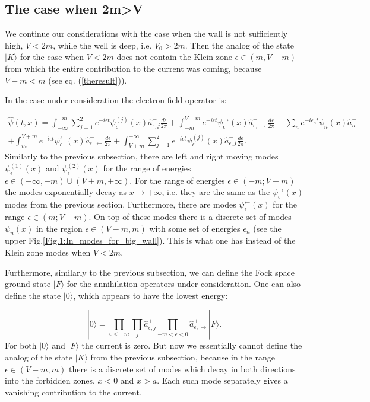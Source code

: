 \documentclass[12pt]{article}
\begin{document}
\subsection{The case when 2m>V}

We continue our considerations with the case when the wall is not sufficiently high, $V<2m$, while the well is deep, i.e. $V_0 > 2m$. Then the analog of the state $|K\rangle$ for the case when $V<2m$ does not contain the Klein zone $\epsilon \in (m,V-m)$ from which the entire contribution to the current was coming, because $V-m < m$ (see eq. (\ref{theresult})).

In the case under consideration the electron field operator is: 

\begin{gather}
\hat{\psi}(t,x) = \int^{-m}_{-\infty}\sum_{j=1}^2e^{-i\epsilon t}\psi_{\epsilon}^{(j)}(x)\hat{a}^{-}_{\epsilon,j}\frac{d\epsilon}{2\pi} +\int^{V-m}_{-m}e^{-i\epsilon t}\psi^{\rightarrow}_{\epsilon}(x)\hat{a}^{-}_{\epsilon,\rightarrow}\frac{d\epsilon}{2\pi}+\sum_{n}e^{-i\epsilon_n t}\psi_{n}(x)\hat{a}^{-}_{n}+\nonumber \\
+\int^{V+m}_{m}e^{-i\epsilon t}\psi^{\leftarrow}_{\epsilon}(x)\hat{a}^{-}_{\epsilon,\leftarrow}\frac{d\epsilon}{2\pi}+\int_{V+m}^{+\infty}\sum_{j=1}^2e^{-i\epsilon t}\psi^{(j)}_{\epsilon}(x)\hat{a}^{-}_{\epsilon,j}\frac{d\epsilon}{2\pi}.
\end{gather}
Similarly to the previous subsection, there are left and right moving modes $\psi^{(1)}_{\epsilon}(x)$ and $\psi^{(2)}_{\epsilon}(x)$ for the range of energies $\epsilon\in(-\infty,-m)\cup(V+m,+\infty)$.
For the range of energies $\epsilon\in(-m;V-m)$ the modes exponentially decay as $x\rightarrow+\infty$, i.e. they are the same as the $\psi^{\rightarrow}_{\epsilon}(x)$ modes from the previous section. Furthermore, there are modes $\psi^{\leftarrow}_{\epsilon}(x)$ for the range $\epsilon\in(m;V+m)$. On top of these modes there is a discrete set of modes $\psi_{n}(x)$ in the region $\epsilon\in(V-m,m)$ with some set of energies $\epsilon_n$ (see the upper Fig.\ref{Fig.1:In_modes_for_big_wall}). This is what one has instead of the Klein zone modes when $V<2m$.

Furthermore, similarly to the previous subsection, we can define the Fock space ground state $|F\rangle$ for the annihilation operators under consideration. One can also define the state $|0\rangle$, which appears to have the lowest energy:

\[|0\rangle=\prod_{\epsilon<-m}\prod_{j}\hat{a}^{+}_{\epsilon,j}\prod_{-m<\epsilon<0}\hat{a}^{+}_{\epsilon,\rightarrow}|F\rangle.\]
For both $|0\rangle$ and $|F\rangle$ the current is zero. But now we essentially cannot define the analog of the state $|K\rangle$ from the previous subsection, because in the range $\epsilon \in (V-m,m)$ there is a discrete set of modes which decay in both directions into the forbidden zones, $x<0$ and $x>a$. Each such mode separately gives a vanishing contribution to the current.
\end{document}
